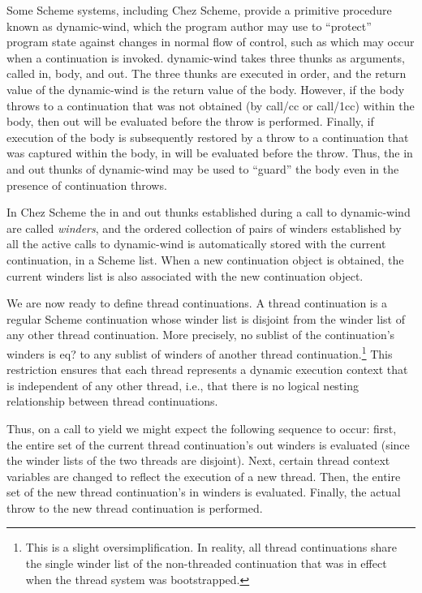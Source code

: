\documentclass{article}
\begin{document}
Some Scheme systems, including Chez Scheme, provide a primitive
procedure known as {\sf dynamic-wind}, which the program author may
use to ``protect'' program state against changes in normal flow of
control, such as which may occur when a continuation is invoked. {\sf
dynamic-wind} takes three thunks as arguments, called {\sf in}, {\sf
body}, and {\sf out}. The three thunks are executed in order, and the
return value of the {\sf dynamic-wind} is the return value of the
body.  However, if the body throws to a continuation that was not
obtained (by {\sf call/cc} or {\sf call/1cc}) within the body, then
{\sf out} will be evaluated before the throw is performed. Finally, if
execution of the body is subsequently restored by a throw to a
continuation that was captured within the body, {\sf in} will be
evaluated before the throw.  Thus, the in and out thunks of {\sf
dynamic-wind} may be used to ``guard'' the body even in the presence
of continuation throws.

In Chez Scheme the in and out thunks established during a call to {\sf
dynamic-wind} are called {\em winders}, and the ordered collection of
pairs of winders established by all the active calls to {\sf
dynamic-wind} is automatically stored with the current continuation,
in a Scheme list.  When a new continuation object is obtained, the
current winders list is also associated with the new continuation
object.

We are now ready to define thread continuations.  A thread
continuation is a regular Scheme continuation whose winder list is
disjoint from the winder list of any other thread continuation.  More
precisely, no sublist of the continuation's winders is {\sf eq?} to
any sublist of winders of another thread continuation.\footnote{This
is a slight oversimplification. In reality, all thread continuations
share the single winder list of the non-threaded continuation that was
in effect when the thread system was bootstrapped.} This restriction
ensures that each thread represents a dynamic execution context that
is independent of any other thread, i.e., that there is no logical
nesting relationship between thread continuations.

Thus, on a call to {\sf yield} we might expect the following sequence
to occur: first, the entire set of the current thread continuation's
out winders is evaluated (since the winder lists of the two threads
are disjoint). Next, certain thread context variables are changed to
reflect the execution of a new thread.  Then, the entire set of the
new thread continuation's in winders is evaluated. Finally, the actual
throw to the new thread continuation is performed.
\end{document}
